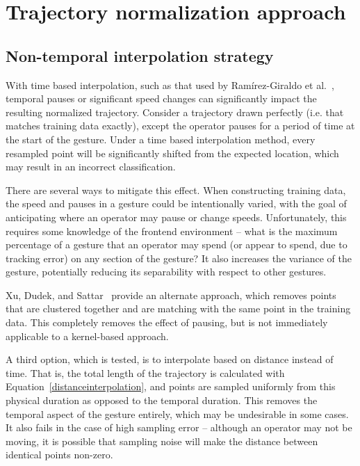 \documentclass[12pt,journal,compsoc]{IEEEtran}
\begin{document}
\section{Trajectory normalization approach}

\subsection{Non-temporal interpolation strategy} \label{timeinvariant}

With time based interpolation, such as that used by Ramírez-Giraldo et al.~\cite{giraldo12},
temporal pauses or significant speed changes can significantly impact the resulting normalized
trajectory. Consider a trajectory drawn perfectly (i.e. that matches training data exactly),
except the operator pauses for a period of time at the start of the gesture. Under a time based 
interpolation method, every resampled point will be significantly shifted from the expected
location, which may result in an incorrect classification.
\par
There are several ways to mitigate this effect. When constructing training data, the speed and pauses
in a gesture could be intentionally varied, with the goal of anticipating where an operator may pause
or change speeds. Unfortunately, this requires some knowledge of the frontend environment -- what is the
maximum percentage of a gesture that an operator may spend (or appear to spend, due to tracking error) on
any section of the gesture? It also increases the variance of the gesture, potentially reducing its
separability with respect to other gestures.
\par
Xu, Dudek, and Sattar~\cite{xu08} provide an alternate approach, which removes points that are clustered
together and are matching with the same point in the training data. This completely removes the effect of
pausing, but is not immediately applicable to a kernel-based approach.
\par
A third option, which is tested, is to interpolate based on distance instead of time. That is, the
total length of the trajectory is calculated with Equation~\ref{distanceinterpolation}, and points
are sampled uniformly from this physical duration as opposed to the temporal duration.
This removes the temporal aspect of the gesture entirely, which may be undesirable in some cases.
It also fails in the case of high sampling error -- although an operator may not be moving,
it is possible that sampling noise will make the distance between identical points non-zero.
\end{document}
